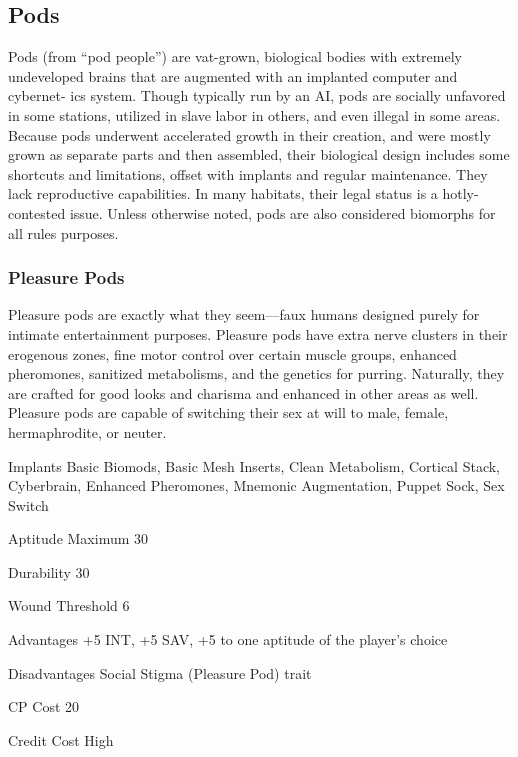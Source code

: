 \subsection{Pods} \label{sec:starting-pods} 

Pods (from “pod people”) are vat-grown, biological bodies with extremely undeveloped brains that are augmented with an implanted computer and cybernet- ics system. Though typically run by an AI, pods are socially unfavored in some stations, utilized in slave labor in others, and even illegal in some areas. Because pods underwent accelerated growth in their creation, and were mostly grown as separate parts and then assembled, their biological design includes some shortcuts and limitations, offset with implants and regular maintenance. They lack reproductive capabilities. In many habitats, their legal status is a hotly-contested issue. Unless otherwise noted, pods are also considered biomorphs for all rules purposes. 

\subsubsection{Pleasure Pods} \label{sec:starting-pleasure-pods} 

Pleasure pods are exactly what they seem—faux humans designed purely for intimate entertainment purposes. Pleasure pods have extra nerve clusters in their erogenous zones, fine motor control over certain muscle groups, enhanced pheromones, sanitized metabolisms, and the genetics for purring. Naturally, they are crafted for good looks and charisma and enhanced in other areas as well. Pleasure pods are capable of switching their sex at will to male, female, hermaphrodite, or neuter. 

\begin{description*} \item[Implants] Basic Biomods, Basic Mesh Inserts, Clean Metabolism, Cortical Stack, Cyberbrain, Enhanced Pheromones, Mnemonic Augmentation, Puppet Sock, Sex Switch \item[Aptitude Maximum] 30 \item[Durability] 30 \item[Wound Threshold] 6 \item[Advantages] +5 INT, +5 SAV, +5 to one aptitude of the player’s choice \item[Disadvantages] Social Stigma (Pleasure Pod) trait \item[CP Cost] 20 \item[Credit Cost] High \end{description*} 

